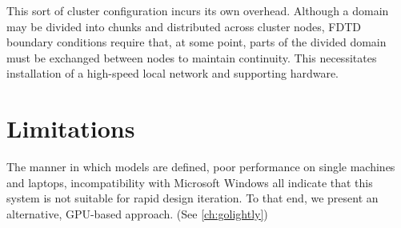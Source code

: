 This sort of cluster configuration incurs its own overhead. Although a domain may be divided into chunks and distributed across cluster nodes, FDTD boundary conditions require that, at some point, parts of the divided domain must be exchanged between nodes to maintain continuity. This necessitates installation of a high-speed local network and supporting hardware. 

\section{Limitations}

The manner in which models are defined, poor performance on single machines and laptops, incompatibility with Microsoft Windows all indicate that this system is not suitable for rapid design iteration. To that end, we present an alternative, GPU-based approach. (See \autoref{ch:golightly})
 




